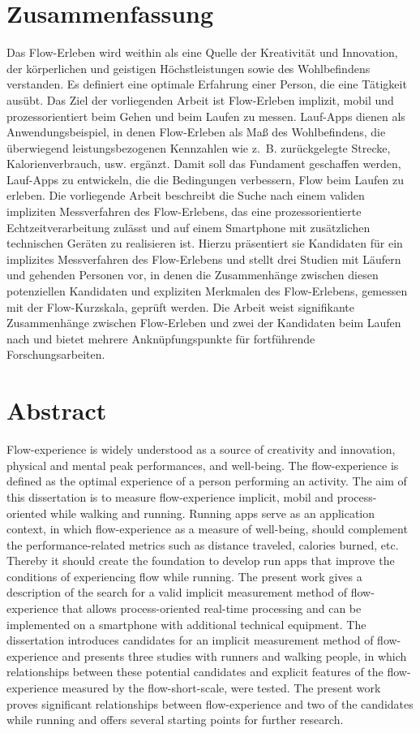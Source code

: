 

\section*{Zusammenfassung} Das Flow-Erleben wird weithin als eine Quelle der Kreativität und Innovation, der körperlichen und geistigen Höchstleistungen sowie des Wohlbefindens verstanden. Es definiert eine optimale Erfahrung einer Person, die eine Tätigkeit ausübt. Das Ziel der vorliegenden Arbeit ist Flow-Erleben implizit, mobil und prozessorientiert beim Gehen und beim Laufen zu messen. Lauf-Apps dienen als Anwendungsbeispiel, in denen Flow-Erleben als Maß des Wohlbefindens, die überwiegend leistungsbezogenen Kennzahlen wie z.~B. zurückgelegte Strecke, Kalorienverbrauch, usw. ergänzt. Damit soll das Fundament geschaffen werden, Lauf-Apps zu entwickeln, die die Bedingungen verbessern, Flow beim Laufen zu erleben. Die vorliegende Arbeit beschreibt die Suche nach einem validen impliziten Messverfahren des Flow-Erlebens, das eine prozessorientierte Echtzeitverarbeitung zulässt und auf einem Smartphone mit zusätzlichen technischen Geräten zu realisieren ist. Hierzu präsentiert sie Kandidaten für ein implizites Messverfahren des Flow-Erlebens und stellt drei Studien mit Läufern und gehenden Personen vor, in denen die Zusammenhänge zwischen diesen potenziellen Kandidaten und expliziten Merkmalen des Flow-Erlebens, gemessen mit der Flow-Kurzskala, geprüft werden. Die Arbeit weist signifikante Zusammenhänge zwischen Flow-Erleben und zwei der Kandidaten beim Laufen nach und bietet mehrere Anknüpfungspunkte für fortführende Forschungsarbeiten. 
\newpage

\section*{Abstract} Flow-experience is widely understood as a source of creativity and innovation, physical and mental peak performances, and well-being. The flow-experience is defined as the optimal experience of a person performing an activity. The aim of this dissertation is to measure flow-experience implicit, mobil and process-oriented while walking and running. Running apps serve as an application context, in which flow-experience as a measure of well-being, should complement the performance-related metrics such as distance traveled, calories burned, etc. Thereby it should create the foundation to develop run apps that improve the conditions of experiencing flow while running. The present work gives a description of the search for a valid implicit measurement method of flow-experience that allows process-oriented real-time processing and can be implemented on a smartphone with additional technical equipment. The dissertation introduces candidates for an implicit measurement method of flow-experience and presents three studies with runners and walking people, in which relationships between these potential candidates and explicit features of the flow-experience measured by the flow-short-scale, were tested. The present work proves significant relationships between flow-experience and two of the candidates while running and offers several starting points for further research. 
